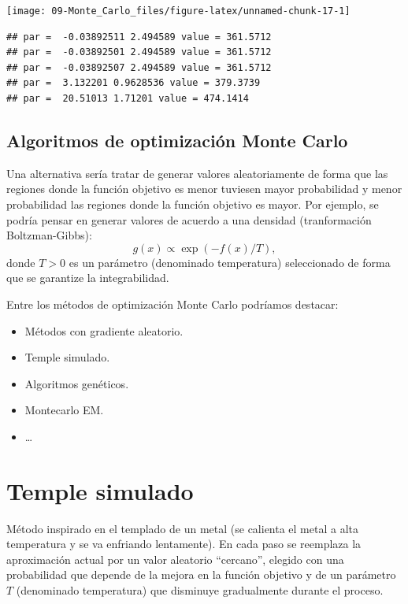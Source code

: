 \documentclass[
]{book}
\theoremstyle{break}
\theoremstyle{definition}
\theoremstyle{definition}
\theoremstyle{definition}
\theoremstyle{definition}
\theoremstyle{remark}
\begin{document}
\begin{center}\texttt{[image: 09-Monte\_Carlo\_files/figure-latex/unnamed-chunk-17-1]} \end{center}

\begin{verbatim}
## par =  -0.03892511 2.494589 value = 361.5712 
## par =  -0.03892501 2.494589 value = 361.5712 
## par =  -0.03892507 2.494589 value = 361.5712 
## par =  3.132201 0.9628536 value = 379.3739 
## par =  20.51013 1.71201 value = 474.1414
\end{verbatim}

\hypertarget{algoritmos-de-optimizaciuxf3n-monte-carlo}{%
\subsection{Algoritmos de optimización Monte Carlo}\label{algoritmos-de-optimizaciuxf3n-monte-carlo}}

Una alternativa sería tratar de generar valores aleatoriamente de
forma que las regiones donde la función objetivo es menor tuviesen
mayor probabilidad y menor probabilidad las regiones donde la
función objetivo es mayor.
Por ejemplo, se podría pensar en generar valores de acuerdo a una
densidad (tranformación
Boltzman-Gibbs):
\[g(x)\propto \exp \left( -f(x)/T\right) ,\]donde
\(T>0\) es un parámetro (denominado temperatura) seleccionado de forma
que se garantize la integrabilidad.

Entre los métodos de optimización Monte Carlo podríamos destacar:

\begin{itemize}
\item
  Métodos con gradiente aleatorio.
\item
  Temple simulado.
\item
  Algoritmos genéticos.
\item
  Montecarlo EM.
\item
  \ldots{}
\end{itemize}

\hypertarget{temple-simulado}{%
\section{Temple simulado}\label{temple-simulado}}

Método inspirado en el templado de un metal (se calienta el metal a
alta temperatura y se va enfriando lentamente).
En cada paso se reemplaza la aproximación actual por un valor
aleatorio ``cercano'', elegido con una probabilidad que depende de la
mejora en la función objetivo y de un parámetro \(T\)
(denominado temperatura) que disminuye gradualmente durante
el proceso.
\end{document}
